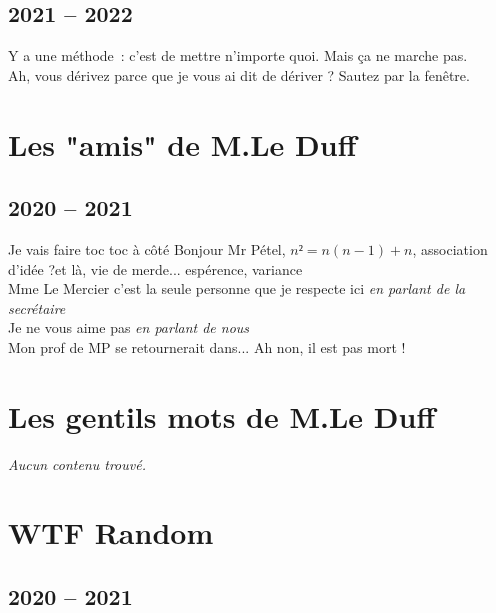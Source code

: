 \documentclass[french, a4paper, openany]{book}
\begin{document}
\section{2021 -- 2022}

	\noindent \og Y a une méthode~: c'est de mettre n'importe quoi. Mais ça ne marche pas. \fg \\
	\og Ah, vous dérivez parce que je vous ai dit de dériver ? Sautez par la fenêtre. \fg \\

\chapter{Les "amis" de M.Le Duff}

\section{2020 -- 2021}

	\noindent \og Je vais faire toc toc à côté \fg Bonjour Mr Pétel, $n² = n(n-1) + n$, association d'idée ?\og et là, vie de merde... \fg espérence, variance\og \fg \\
	\og Mme Le Mercier c'est la seule personne que je respecte ici \fg \emph{en parlant de la secrétaire} \\
	\og Je ne vous aime pas \fg \emph{en parlant de nous} \\
	\og Mon prof de MP se retournerait dans... Ah non, il est pas mort ! \fg \\

\chapter{Les gentils mots de M.Le Duff}

	 \noindent \emph{Aucun contenu trouvé.} \\
 
\chapter{WTF Random}

\section{2020 -- 2021}
\end{document}
